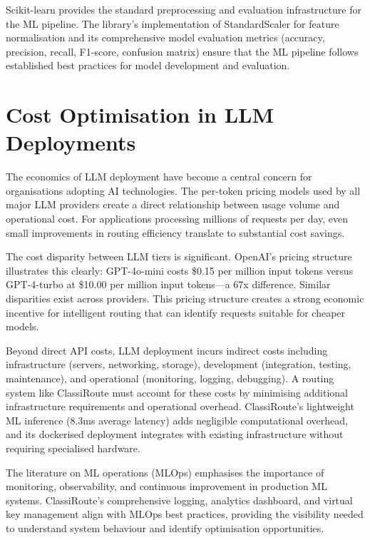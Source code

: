 \documentclass[oneside,12pt,a4paper]{report}
\begin{document}
Scikit-learn \cite{pedregosa2011sklearn} provides the standard preprocessing and evaluation infrastructure for the ML pipeline. The library's implementation of StandardScaler for feature normalisation and its comprehensive model evaluation metrics (accuracy, precision, recall, F1-score, confusion matrix) ensure that the ML pipeline follows established best practices for model development and evaluation.

\section{Cost Optimisation in LLM Deployments}

The economics of LLM deployment have become a central concern for organisations adopting AI technologies. The per-token pricing models used by all major LLM providers create a direct relationship between usage volume and operational cost. For applications processing millions of requests per day, even small improvements in routing efficiency translate to substantial cost savings.

The cost disparity between LLM tiers is significant. OpenAI's pricing structure illustrates this clearly: GPT-4o-mini costs \$0.15 per million input tokens versus GPT-4-turbo at \$10.00 per million input tokens---a 67x difference. Similar disparities exist across providers. This pricing structure creates a strong economic incentive for intelligent routing that can identify requests suitable for cheaper models.

Beyond direct API costs, LLM deployment incurs indirect costs including infrastructure (servers, networking, storage), development (integration, testing, maintenance), and operational (monitoring, logging, debugging). A routing system like ClassiRoute must account for these costs by minimising additional infrastructure requirements and operational overhead. ClassiRoute's lightweight ML inference (8.3ms average latency) adds negligible computational overhead, and its dockerised deployment integrates with existing infrastructure without requiring specialised hardware.

The literature on ML operations (MLOps) emphasises the importance of monitoring, observability, and continuous improvement in production ML systems. ClassiRoute's comprehensive logging, analytics dashboard, and virtual key management align with MLOps best practices, providing the visibility needed to understand system behaviour and identify optimisation opportunities.
\end{document}
